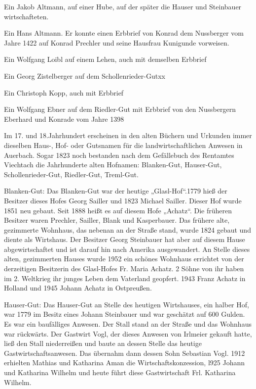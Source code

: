 \documentclass[12pt,a4pager]{book}
\begin{document}
Ein Jakob Altmann, auf einer Hube, auf der später die Hauser und Steinbauer
wirtschafteten.

Ein Hans Altmann. Er konnte einen Erbbrief von Konrad dem Nussberger vom Jahre
1422 auf Konrad Prechler und seine Hausfrau Kunigunde vorweisen.

Ein Wolfgang Loibl auf einem Lehen, auch mit demselben Erbbrief

Ein Georg Zistelberger auf dem Schollenrieder-Gutxx

Ein Christoph Kopp, auch mit Erbbrief

Ein Wolfgang Ebner auf dem Riedler-Gut mit Erbbrief von den Nussbergern Eberhard
und Konrade vom Jahre 1398

Im 17. und 18.Jahrhundert erscheinen in den alten Büchern und Urkunden immer
dieselben Haus-, Hof- oder Gutsnamen für die landwirtschaftlichen Anwesen in
Auerbach. Sogar 1823 noch bestanden nach dem Gefällebuch des Rentamtes Viechtach
die Jahrhunderte alten Hofnamen: Blanken-Gut, Hauser-Gut, Schollenrieder-Gut,
Riedler-Gut, Treml-Gut.

Blanken-Gut: Das Blanken-Gut war der heutige „Glasl-Hof“.1779 hieß der Besitzer
dieses Hofes Georg Sailler und 1823 Michael Sailler. Dieser Hof wurde 1851 neu
gebaut. Seit 1888 heißt es auf diesem Hofe „Achatz“. Die früheren Besitzer waren
Prechler, Sailler, Blank und Kasperbauer. Das frühere alte, gezimmerte Wohnhaus,
das nebenan an der Straße stand, wurde 1824 gebaut und diente als Wirtshaus. Der
Besitzer Georg Steinbauer hat aber auf diesem Hause abgewirtschaftet und ist
darauf hin nach Amerika ausgewandert. An Stelle dieses alten, gezimmerten Hauses
wurde 1952 ein schönes Wohnhaus errichtet von der derzeitigen Besitzerin des
Glasl-Hofes Fr. Maria Achatz. 2 Söhne von ihr haben im 2. Weltkrieg ihr junges
Leben dem Vaterland geopfert. 1943 Franz Achatz in Holland und 1945 Johann
Achatz in Ostpreußen.

Hauser-Gut: Das Hauser-Gut an Stelle des heutigen Wirtshauses, ein halber Hof,
war 1779 im Besitz eines Johann Steinbauer und war geschätzt auf 600 Gulden. Es
war ein baufälliges Anwesen. Der Stall stand an der Straße und das Wohnhaus war
rückwärts. Der Gastwirt Vogl, der dieses Anwesen von Irlmeier gekauft hatte,
ließ den Stall niederreißen und baute an dessen Stelle das heutige
Gastwirtschaftsanwesen. Das übernahm dann dessen Sohn Sebastian Vogl. 1912
erhielten Mathias und Katharina Aman die Wirtschaftskonzession, l925 Johann und
Katharina Wilhelm und heute führt diese Gastwirtschaft Frl. Katharina Wilhelm.
\end{document}
